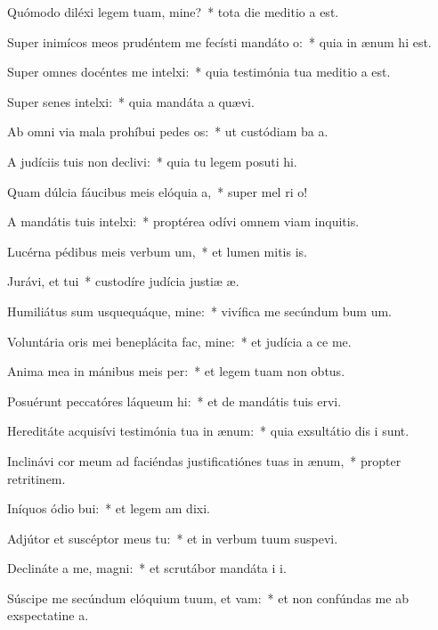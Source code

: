 \item Quómodo diléxi legem tuam, mine?~* tota die meditio a est.
\item Super inimícos meos prudéntem me fecísti mandáto o:~* quia in ænum hi est.
\item Super omnes docéntes me intelxi:~* quia testimónia tua meditio a est.
\item Super senes intelxi:~* quia mandáta a quævi.
\item Ab omni via mala prohíbui pedes os:~* ut custódiam ba a.
\item A judíciis tuis non declivi:~* quia tu legem posuti hi.
\item Quam dúlcia fáucibus meis elóquia a,~* super mel ri o!
\item A mandátis tuis intelxi:~* proptérea odívi omnem viam inquitis.
\item Lucérna pédibus meis verbum um,~* et lumen mitis is.
\item Jurávi, et tui~* custodíre judícia justiæ æ.
\item Humiliátus sum usquequáque, mine:~* vivífica me secúndum bum um.
\item Voluntária oris mei beneplácita fac, mine:~* et judícia a ce me.
\item Anima mea in mánibus meis per:~* et legem tuam non  obtus.
\item Posuérunt peccatóres láqueum hi:~* et de mandátis tuis  ervi.
\item Hereditáte acquisívi testimónia tua in ænum:~* quia exsultátio dis i sunt.
\item Inclinávi cor meum ad faciéndas justificatiónes tuas in ænum,~* propter retritinem.
\item Iníquos ódio bui:~* et legem am dixi.
\item Adjútor et suscéptor meus  tu:~* et in verbum tuum suspevi.
\item Declináte a me, magni:~* et scrutábor mandáta i i.
\item Súscipe me secúndum elóquium tuum, et vam:~* et non confúndas me ab exspectatine a.
